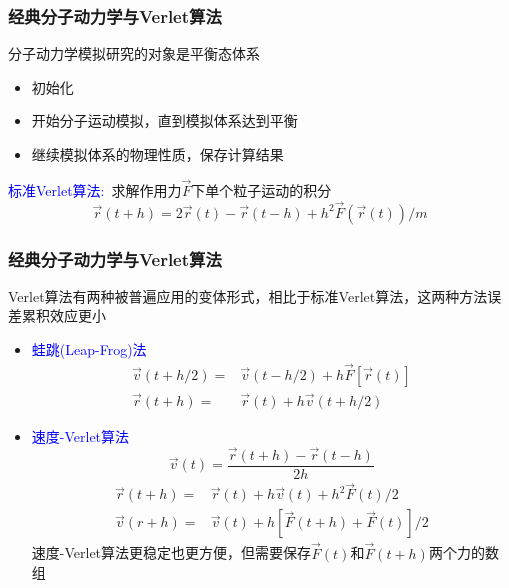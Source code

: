 \frame
{
	\frametitle{经典分子动力学与\textrm{Verlet}算法}
	分子动力学模拟研究的对象是平衡态体系
	\begin{itemize}
		\item 初始化
		\item 开始分子运动模拟，直到模拟体系达到平衡
		\item 继续模拟体系的物理性质，保存计算结果
	\end{itemize}
	\textcolor{blue}{标准\textrm{Verlet}算法:~}求解作用力$\vec F$下单个粒子运动的积分
	\begin{displaymath}
		\vec r(t+h)=2\vec r(t)-\vec r(t-h)+h^2\vec F(\vec r(t))/m
	\end{displaymath}
	{\fontsize{7.2pt}{6.2pt}}
}

\frame
{
	\frametitle{经典分子动力学与\textrm{Verlet}算法}
	\textrm{Verlet}算法有两种被普遍应用的变体形式，相比于标准\textrm{Verlet}算法，这两种方法误差累积效应更小
	\begin{itemize}
		\item \textcolor{blue}{蛙跳(\textrm{Leap-Frog})法}
			\begin{displaymath}
				\begin{aligned}
					\vec v(t+h/2)=&\vec v(t-h/2)+h\vec F[\vec r(t)]\\
					\vec r(t+h)=&\vec r(t)+h\vec v(t+h/2)
				\end{aligned}
			\end{displaymath}
		\item \textcolor{blue}{速度-\textrm{Verlet}算法}
			\begin{displaymath}
				\vec v(t)=\dfrac{\vec r(t+h)-\vec r(t-h)}{2h}
			\end{displaymath}
			\begin{displaymath}
				\begin{aligned}
					\vec r(t+h)=&\vec r(t)+h\vec v(t)+h^2\vec F(t)/2\\
					\vec v(r+h)=&\vec v(t)+h[\vec F(t+h)+\vec F(t)]/2
				\end{aligned}
			\end{displaymath}
			速度-\textrm{Verlet}算法更稳定也更方便，但需要保存$\vec F(t)$和$\vec F(t+h)$两个力的数组
	\end{itemize}
}


